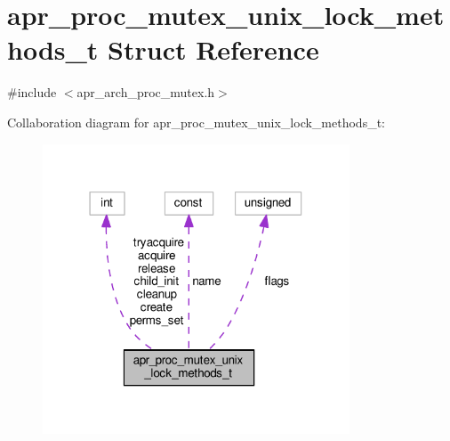 \hypertarget{structapr__proc__mutex__unix__lock__methods__t}{}\section{apr\+\_\+proc\+\_\+mutex\+\_\+unix\+\_\+lock\+\_\+methods\+\_\+t Struct Reference}
\label{structapr__proc__mutex__unix__lock__methods__t}


{\ttfamily \#include $<$apr\+\_\+arch\+\_\+proc\+\_\+mutex.\+h$>$}



Collaboration diagram for apr\+\_\+proc\+\_\+mutex\+\_\+unix\+\_\+lock\+\_\+methods\+\_\+t\+:
\nopagebreak
\begin{figure}[H]
\begin{center}
\leavevmode
\includegraphics[width=259pt]{structapr__proc__mutex__unix__lock__methods__t__coll__graph}
\end{center}
\end{figure}
